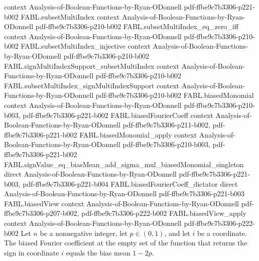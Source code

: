 \begin{theorem}
  {context}
  {Analysis-of-Boolean-Functions-by-Ryan-ODonnell}
  {pdf-ffbe9c7b3306-p221-b002}
\proofstep
  {FABL.subsetMultiIndex}
  {context}
  {Analysis-of-Boolean-Functions-by-Ryan-ODonnell}
  {pdf-ffbe9c7b3306-p210-b002}
\proofstep
  {FABL.subsetMultiIndex_eq_zero_iff}
  {context}
  {Analysis-of-Boolean-Functions-by-Ryan-ODonnell}
  {pdf-ffbe9c7b3306-p210-b002}
\proofstep
  {FABL.subsetMultiIndex_injective}
  {context}
  {Analysis-of-Boolean-Functions-by-Ryan-ODonnell}
  {pdf-ffbe9c7b3306-p210-b002}
\proofstep
  {FABL.signMultiIndexSupport_subsetMultiIndex}
  {context}
  {Analysis-of-Boolean-Functions-by-Ryan-ODonnell}
  {pdf-ffbe9c7b3306-p210-b002}
\proofstep
  {FABL.subsetMultiIndex_signMultiIndexSupport}
  {context}
  {Analysis-of-Boolean-Functions-by-Ryan-ODonnell}
  {pdf-ffbe9c7b3306-p210-b002}
\proofstep
  {FABL.biasedMonomial}
  {context}
  {Analysis-of-Boolean-Functions-by-Ryan-ODonnell}
  {pdf-ffbe9c7b3306-p210-b003,
    pdf-ffbe9c7b3306-p221-b002}
\proofstep
  {FABL.biasedFourierCoeff}
  {context}
  {Analysis-of-Boolean-Functions-by-Ryan-ODonnell}
  {pdf-ffbe9c7b3306-p211-b002,
    pdf-ffbe9c7b3306-p221-b002}
\proofstep
  {FABL.biasedMonomial_apply}
  {context}
  {Analysis-of-Boolean-Functions-by-Ryan-ODonnell}
  {pdf-ffbe9c7b3306-p210-b003,
    pdf-ffbe9c7b3306-p221-b002}
\proofstep
  {FABL.signValue_eq_biasMean_add_sigma_mul_biasedMonomial_singleton}
  {direct}
  {Analysis-of-Boolean-Functions-by-Ryan-ODonnell}
  {pdf-ffbe9c7b3306-p221-b003,
    pdf-ffbe9c7b3306-p221-b004}
\proofstep
  {FABL.biasedFourierCoeff_dictator}
  {direct}
  {Analysis-of-Boolean-Functions-by-Ryan-ODonnell}
  {pdf-ffbe9c7b3306-p221-b003}
\proofstep
  {FABL.biasedView}
  {context}
  {Analysis-of-Boolean-Functions-by-Ryan-ODonnell}
  {pdf-ffbe9c7b3306-p207-b002,
    pdf-ffbe9c7b3306-p222-b002}
\proofstep
  {FABL.biasedView_apply}
  {context}
  {Analysis-of-Boolean-Functions-by-Ryan-ODonnell}
  {pdf-ffbe9c7b3306-p222-b002}
Let $n$ be a nonnegative integer, let $p\in(0,1)$, and let $i$ be a coordinate. The
biased Fourier coefficient at the empty set of the function that returns the sign in
coordinate $i$ equals the bias mean $1-2p$.
\end{theorem}

